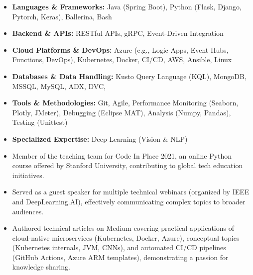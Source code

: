\documentclass[12pt,a4paper,withhyper]{altacv}
\begin{document}
\medskip



\medskip

\begin{itemize}
    \item \textbf{Languages \& Frameworks:} Java (Spring Boot), Python (Flask, Django, Pytorch, Keras), Ballerina, Bash
    \item \textbf{Backend \& APIs:} RESTful APIs, gRPC, Event-Driven Integration
    \item \textbf{Cloud Platforms \& DevOps:} Azure (e.g., Logic Apps, Event Hubs, Functions, DevOps), Kubernetes, Docker, CI/CD, AWS, Ansible, Linux
    \item \textbf{Databases \& Data Handling:} Kusto Query Language (KQL), MongoDB, MSSQL, MySQL, ADX, DVC,
    \item \textbf{Tools \& Methodologies:} Git, Agile, Performance Monitoring (Seaborn, Plotly, JMeter), Debugging (Eclipse MAT), Analysis (Numpy, Pandas), Testing (Unittest)
    \item \textbf{Specialized Expertise:} Deep Learning (Vision \& NLP)
\end{itemize}

\medskip

\begin{itemize}
    \item Member of the teaching team for Code In Place 2021, an online Python course offered by Stanford University, contributing to global tech education initiatives.
    \item Served as a guest speaker for multiple technical webinars (organized by IEEE and DeepLearning.AI), effectively communicating complex topics to broader audiences.
    \item  Authored technical articles on Medium covering practical applications of cloud-native microservices (Kubernetes, Docker, Azure), conceptual topics (Kubernetes internals, JVM, CNNs), and automated CI/CD pipelines (GitHub Actions, Azure ARM templates), demonstrating a passion for knowledge sharing.
\end{itemize}
\end{document}
